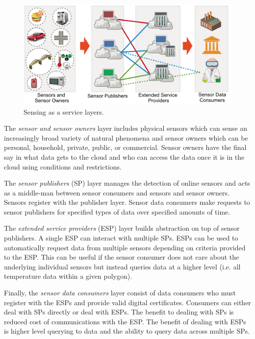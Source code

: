 \documentclass[]{article}
\begin{document}
\begin{figure}
    \centering
    \includegraphics[width=1.0\linewidth]{img/sensing-as-a-service}
    \caption[Sensing as a service layers.]{Sensing as a service layers.\cite{perera_sensing_2014}}
    \label{fig:sensing-as-a-service}
\end{figure}

The \textit{sensor and sensor owners} layer includes physical sensors which can sense an increasingly broad variety of natural phenomena and sensor owners which can be personal, household, private, public, or commercial. Sensor owners have the final say in what data gets to the cloud and who can access the data once it is in the cloud using conditions and restrictions.

The \textit{sensor publishers} (SP) layer manages the detection of online sensors and acts as a middle-man between sensor consumers and sensors and sensor owners. Sensors register with the publisher layer. Sensor data consumers make requests to sensor publishers for specified types of data over specified amounts of time.

The \textit{extended service providers} (ESP) layer builds abstraction on top of sensor publishers. A single ESP can interact with multiple SPs. ESPs can be used to automatically request data from multiple sensors depending on criteria provided to the ESP. This can be useful if the sensor consumer does not care about the underlying individual sensors but instead queries data at a higher level (i.e. all temperature data within a given polygon).

Finally, the \textit{sensor data consumers} layer consist of data consumers who must register with the ESPs and provide valid digital certificates. Consumers can either deal with SPs directly or deal with ESPs. The benefit to dealing with SPs is reduced cost of communications with the ESP. The benefit of dealing with ESPs is higher level querying to data and the ability to query data across multiple SPs.
\end{document}
